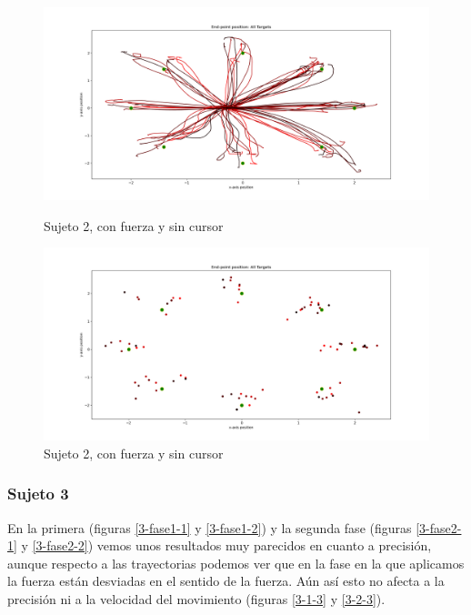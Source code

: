 \documentclass[a4paper,11pt, oneside]{book}
\begin{document}
\begin{figure}[H]
	\begin{minipage}[b]{0.5\linewidth}
		\centering
		\includegraphics[width=\linewidth]{sujeto2/force_no_cursor/trayectorias}
		\caption{Sujeto 2, con fuerza y sin cursor}
		\label{2-fase4-1}
	\end{minipage}
	\hspace{0.5cm}
	\begin{minipage}[b]{0.5\linewidth}
		\centering
		\includegraphics[width=\linewidth]{sujeto2/force_no_cursor/trayectorias_puntos}
		\caption{Sujeto 2, con fuerza y sin cursor}
		\label{2-fase4-2}
	\end{minipage}
\end{figure}

\subsubsection{Sujeto 3}

En la primera (figuras \ref{3-fase1-1} y \ref{3-fase1-2}) y la segunda fase (figuras \ref{3-fase2-1} y \ref{3-fase2-2}) vemos unos resultados muy parecidos en cuanto a precisión, aunque respecto a las trayectorias podemos ver que en la fase en la que aplicamos la fuerza están desviadas en el sentido de la fuerza. Aún así esto no afecta a la precisión ni a la velocidad del movimiento (figuras \ref{3-1-3} y \ref{3-2-3}).
\end{document}
